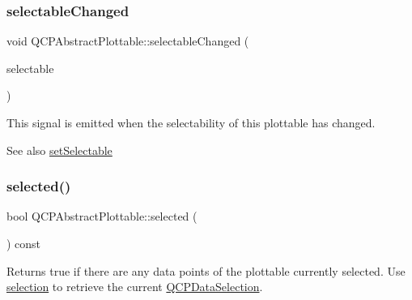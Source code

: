 \mbox{\label{class_q_c_p_abstract_plottable_a663b1a44123c8340ac041a29d1e2c973}} 
\subsubsection{\texorpdfstring{selectableChanged}{selectableChanged}}
{\footnotesize\ttfamily void Q\+C\+P\+Abstract\+Plottable\+::selectable\+Changed (\begin{DoxyParamCaption}\item[{\mbox{\hyperlink{namespace_q_c_p_ac6cb9db26a564b27feda362a438db038}{Q\+C\+P\+::\+Selection\+Type}}}]{selectable }\end{DoxyParamCaption})\hspace{0.3cm}{\ttfamily [signal]}}

This signal is emitted when the selectability of this plottable has changed.

\begin{DoxySeeAlso}{See also}
\mbox{\hyperlink{class_q_c_p_abstract_plottable_ac238d6e910f976f1f30d41c2bca44ac3}{set\+Selectable}} 
\end{DoxySeeAlso}
\mbox{\label{class_q_c_p_abstract_plottable_a0b3b514474fe93354fc74cfc144184b4}} 
\subsubsection{\texorpdfstring{selected()}{selected()}}
{\footnotesize\ttfamily bool Q\+C\+P\+Abstract\+Plottable\+::selected (\begin{DoxyParamCaption}{ }\end{DoxyParamCaption}) const\hspace{0.3cm}{\ttfamily [inline]}}

Returns true if there are any data points of the plottable currently selected. Use \mbox{\hyperlink{class_q_c_p_abstract_plottable_a040bf09f41d456284cfd39cc37aa068f}{selection}} to retrieve the current \mbox{\hyperlink{class_q_c_p_data_selection}{Q\+C\+P\+Data\+Selection}}. \mbox{\label{class_q_c_p_abstract_plottable_a2d488568cf16600dd81fa23d7d439829}} 
